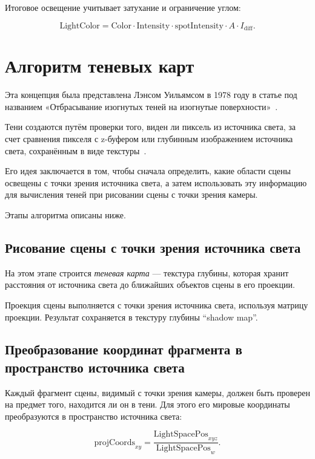 Итоговое освещение учитывает затухание и ограничение углом:

\begin{equation}
    \label{equ:spot_lambert}
    \text{LightColor} = \text{Color} \cdot \text{Intensity} \cdot \text{spotIntensity} \cdot A \cdot I_{\text{diff}}.
\end{equation}

\section{Алгоритм теневых карт}

Эта концепция была представлена Лэнсом Уильямсом в 1978 году
в статье под названием
«Отбрасывание изогнутых теней на изогнутые поверхности»~\cite{history}.

Тени создаются путём проверки того, виден ли пиксель из источника света,
за счет сравнения пикселя с z-буфером или глубинным изображением источника света,
сохранённым в виде текстуры~\cite{OpenGL_DevidVolf}.

Его идея заключается в том, чтобы сначала определить,
какие области сцены освещены с точки зрения источника света,
а затем использовать эту информацию для вычисления теней
при рисовании сцены с точки зрения камеры.

Этапы алгоритма описаны ниже.

\subsection*{Рисование сцены с точки зрения источника света}

На этом этапе строится \textit{теневая карта} — текстура глубины,
которая хранит расстояния от источника света до ближайших объектов сцены в его проекции.

Проекция сцены выполняется с точки зрения источника света, используя матрицу проекции.
Результат сохраняется в текстуру глубины \enquote{shadow map}.

\subsection*{Преобразование координат фрагмента в пространство источника света}

Каждый фрагмент сцены, видимый с точки зрения камеры,
должен быть проверен на предмет того, находится ли он в тени.
Для этого его мировые координаты преобразуются в пространство источника света:

\begin{equation}
    \label{equ:projected_coords}
    \text{projCoords}_{xy} = \frac{\text{LightSpacePos}_{xyz}}{\text{LightSpacePos}_w}.
\end{equation}

